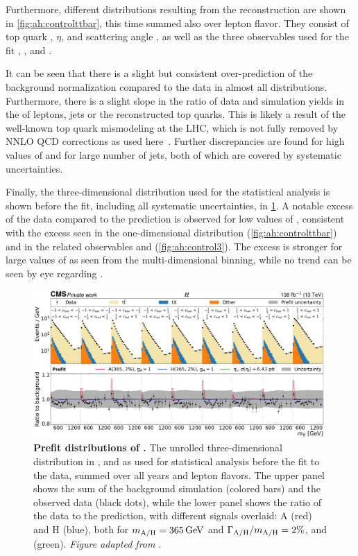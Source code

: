 Furthermore, different distributions resulting from the \ttbar reconstruction are shown in \cref{fig:ah:controlttbar}, this time summed also over lepton flavor. They consist of top quark \pt, $\eta$, and scattering angle \cost, as well as the three observables used for the fit \mtt, \chel, and \chan.

It can be seen that there is a slight but consistent over-prediction of the background normalization compared to the data in almost all distributions. Furthermore, there is a slight slope in the ratio of data and simulation yields in the \pt of leptons, jets or the reconstructed top quarks. This is likely a result of the well-known top quark \pt mismodeling at the LHC, which is not fully removed by NNLO QCD corrections as used here~\cite{CMS:TOP-16-008,CMS:TOP-17-014}. Further discrepancies are found for high values of \abseta and for large number of jets, both of which are covered by systematic uncertainties.

Finally, the three-dimensional \mttchelchan distribution used for the statistical analysis is shown before the fit, including all systematic uncertainties, in \cref{fig:ah:prefit_ll}. A notable excess of the data compared to the prediction is observed for low values of \mtt, consistent with the excess seen in the one-dimensional \mtt distribution (\cref{fig:ah:controlttbar}) and in the related observables \mll and \mbbll (\cref{fig:ah:control3}). The excess is stronger for large values of \chel as seen from the multi-dimensional binning, while no trend can be seen by eye regarding \chan.

\begin{figure}[t]
    \centering
    \includegraphics[width=0.99\textwidth]{figures/ah/prepost/A_m365_w2p0__H_m365_w2p0_fit_p_ll_run2_both.pdf}
    \caption{
        \textbf{Prefit distributions of \mttchelchan.} The unrolled three-dimensional distribution in \mtt, \chel and \chan as used for statistical analysis before the fit to the data, summed over all years and lepton flavors. The upper panel shows the sum of the background simulation (colored bars) and the observed data (black dots), while the lower panel shows the ratio of the data to the prediction, with different signals overlaid: A (red) and H (blue), both for $\mAH = \SI{365}{\GeV}$ and $\Gamma_{\mathrm{A/H}}/m_{\mathrm{A/H}} = 2\%$, and \etat (green). \textit{Figure adapted from }.
    }
    \label{fig:ah:prefit_ll}
\end{figure}

